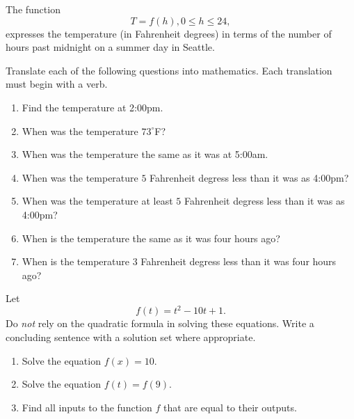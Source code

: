 \documentclass{ximera}
\begin{document}
\begin{question}  \label{Qhjk88654g6}
The function 
\[
         T =  f(h) , 0\leq h \leq 24,
\]
expresses the temperature (in Fahrenheit degrees) in terms of the number of hours past midnight on a summer day in Seattle.

Translate each of the following questions into mathematics. Each translation must begin with a verb.
\begin{enumerate}
\item Find the temperature at 2:00pm.

\item When was the temperature $73^\circ$F?

\item When was the temperature the same as it was at 5:00am.

\item When was the temperature $5$ Fahrenheit degress less than it was as 4:00pm?

\item When was the temperature at least $5$ Fahrenheit degress less than it was as 4:00pm?

\item When is the temperature the same as it was four hours ago?

\item When is the temperature $3$ Fahrenheit degress less than it was four hours ago?
\end{enumerate}

\end{question}


\begin{question}  \label{Qsdfsdftiii}
Let 
\[
        f(t) = t^2 - 10t + 1 .
\]
Do \emph{not} rely on the quadratic formula in solving these equations. Write a concluding sentence with a solution set where appropriate.
\begin{enumerate}
\item Solve the equation $f(x) = 10$.

\item Solve the equation $f(t) = f(9)$.

\item Find all inputs to the function $f$ that are equal to their outputs.
\end{enumerate}
\end{question}
\end{document}
